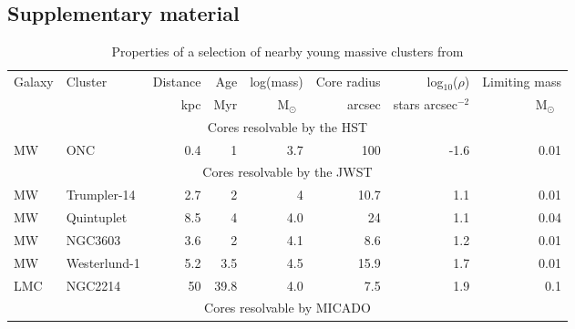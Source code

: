 \documentclass{aa}
\newcommand{\msun}{M$_\odot$~}
\newcommand{\h}[1]{$^{#1}$}
\begin{document}

\begin{appendix}

\section{Supplementary material}
\label{sec:appendix}

\begin{table*}
    \centering
    \caption{Properties of a selection of nearby young massive clusters from \citet{portegies2010}}
    \label{tbl:pz10_selection}
    \begin{tabular}{l l r r r r r r}
        \hline\hline
        Galaxy & Cluster      & Distance & Age  & log(mass) & Core radius & log$_{10}$($\rho$)    & Limiting mass \\
              &              & kpc      & Myr  & \msun     & arcsec  & stars arcsec\h{-2} & \msun         \\
        \hline
        \multicolumn{8}{c}{Cores resolvable by the HST}                                                     \\
        \hline
        MW     & ONC          & 0.4      & 1    & 3.7       & 100     & -1.6           & 0.01          \\
        \hline
        \multicolumn{8}{c}{Cores resolvable by the JWST}                                                    \\
        \hline
        MW     & Trumpler-14  & 2.7      & 2    & 4         & 10.7    & 1.1            & 0.01          \\
        MW     & Quintuplet   & 8.5      & 4    & 4.0       & 24      & 1.1            & 0.04          \\
        MW     & NGC3603      & 3.6      & 2    & 4.1       & 8.6     & 1.2            & 0.01          \\
        MW     & Westerlund-1 & 5.2      & 3.5  & 4.5       & 15.9    & 1.7            & 0.01          \\
        LMC    & NGC2214      & 50       & 39.8 & 4.0       & 7.5     & 1.9            & 0.1           \\
        \hline
        \multicolumn{8}{c}{Cores resolvable by MICADO}                                                  \\

\end{tabular}
\end{table*}
\end{appendix}
\end{document}
